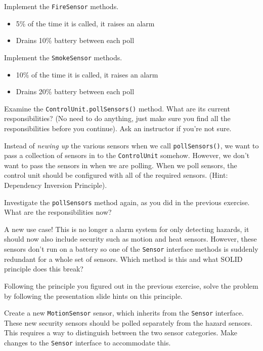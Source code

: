 \documentclass[12pt,a4paper,times]{exam}
\begin{document}
\begin{questions}

\question
Implement the \verb!FireSensor! methods.
\begin{itemize}
\item 5\% of the time it is called, it raises an alarm
\item Drains 10\% battery between each poll
\end{itemize}

\question
Implement the \verb!SmokeSensor! methods.
\begin{itemize}
\item 10\% of the time it is called, it raises an alarm
\item Drains 20\% battery between each poll
\end{itemize}

\question
Examine the \verb!ControlUnit.pollSensors()! method. 
What are its current responsibilities? 
(No need to do anything, just make sure you find all the responsibilities before you continue).
Ask an instructor if you're not sure.

\question
Instead of \emph{newing up} the various sensors when we call \verb!pollSensors()!, 
we want to pass a collection of sensors in to the \verb!ControlUnit! somehow. 
However, we don't want to pass the sensors in when we are polling. 
When we poll sensors, the control unit should be configured with all of the required sensors.
(Hint: Dependency Inversion Principle).

\question
Investigate the \verb!pollSensors! method again, as you did in the previous exercise. 
What are the responsibilities now?

\question
A new use case! This is no longer a alarm system for only detecting hazards, 
it should now also include security such as motion and heat sensors. 
However, these sensors don't run on a battery so one of the \verb!Sensor! 
interface methods is suddenly redundant for a whole set of sensors. 
Which method is this and what SOLID principle does this break?

\question
Following the principle you figured out in the previous exercise, 
solve the problem by following the presentation slide hints on this principle. 

\question
Create a new \verb!MotionSensor! sensor, which inherits from the \verb!Sensor! interface. 
These new security sensors should be polled separately from the hazard sensors. 
This requires a way to distinguish between the two sensor categories. 
Make changes to the \verb!Sensor! interface to accommodate this.


\end{questions}
\end{document}
